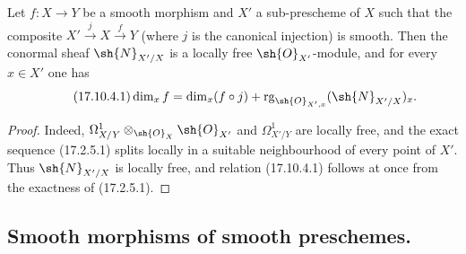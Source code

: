 \begin{corollary}[17.10.4]
\label{IV.17.10.4}
Let $f:X\to Y$ be a smooth morphism and $X'$ a sub-prescheme of $X$ such that the composite $X'\xrightarrow{j}X\xrightarrow{f}Y$ (where $j$ is the canonical injection) is smooth.
Then the conormal sheaf $\sh{N}_{X'/X}$ is a locally free $\sh{O}_{X'}$-module, and for every $x\in X'$ one has
\begin{equation}
\label{IV.17.10.4.1}
\tag{17.10.4.1}
  \dim_x f = \dim_x(f\circ j) + \operatorname{rg}_{\sh{O}_{X',x}}(\sh{N}_{X'/X})_x.
\end{equation}
\end{corollary}

\begin{proof}
Indeed, $\Omega^1_{X/Y}\otimes_{\sh{O}_X}\sh{O}_{X'}$ and $\Omega^1_{X'/Y}$ are locally free, and the exact sequence (17.2.5.1) splits locally in a suitable neighbourhood of every point of $X'$.
Thus $\sh{N}_{X'/X}$ is locally free, and relation (17.10.4.1) follows at once from the exactness of (17.2.5.1).
\end{proof}


\subsection{Smooth morphisms of smooth preschemes.}
\label{subsection:IV.17.11}

